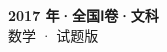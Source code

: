 \documentclass[zihao=-4, a4paper]{ctexart}
\begin{document}
\begin{center}
  {\Large\bfseries 2017 年·全国Ⅰ卷·文科}\\[4pt]
  {\large 数学 · 试题版}
\end{center}
\medskip
{}

\end{document}
